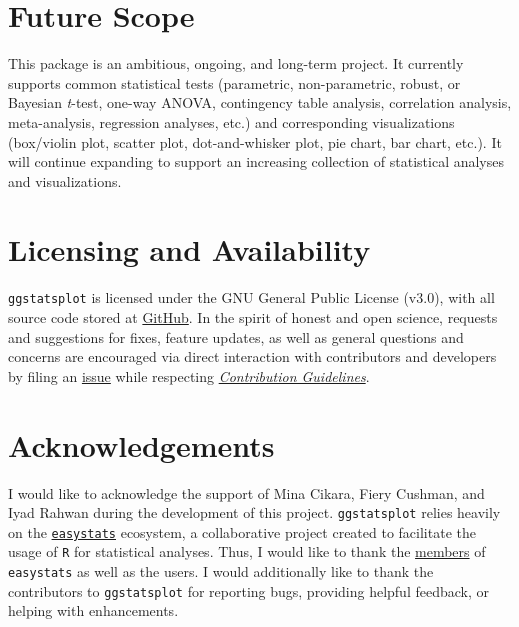 \documentclass[10pt,a4paper,onecolumn]{article}
\begin{document}
\hypertarget{future-scope}{%
\section{Future Scope}\label{future-scope}}

This package is an ambitious, ongoing, and long-term project. It
currently supports common statistical tests (parametric, non-parametric,
robust, or Bayesian \emph{t}-test, one-way ANOVA, contingency table
analysis, correlation analysis, meta-analysis, regression analyses,
etc.) and corresponding visualizations (box/violin plot, scatter plot,
dot-and-whisker plot, pie chart, bar chart, etc.). It will continue
expanding to support an increasing collection of statistical analyses
and visualizations.

\hypertarget{licensing-and-availability}{%
\section{Licensing and Availability}\label{licensing-and-availability}}

\texttt{ggstatsplot} is licensed under the GNU General Public License
(v3.0), with all source code stored at
\href{https://github.com/IndrajeetPatil/ggstatsplot/}{GitHub}. In the
spirit of honest and open science, requests and suggestions for fixes,
feature updates, as well as general questions and concerns are
encouraged via direct interaction with contributors and developers by
filing an
\href{https://github.com/IndrajeetPatil/ggstatsplot/issues}{issue} while
respecting
\href{https://indrajeetpatil.github.io/ggstatsplot/CONTRIBUTING.html}{\emph{Contribution
Guidelines}}.

\hypertarget{acknowledgements}{%
\section{Acknowledgements}\label{acknowledgements}}

I would like to acknowledge the support of Mina Cikara, Fiery Cushman,
and Iyad Rahwan during the development of this project.
\texttt{ggstatsplot} relies heavily on the
\href{https://github.com/easystats/easystats}{\texttt{easystats}}
ecosystem, a collaborative project created to facilitate the usage of
\texttt{R} for statistical analyses. Thus, I would like to thank the
\href{https://github.com/orgs/easystats/people}{members} of
\texttt{easystats} as well as the users. I would additionally like to
thank the contributors to \texttt{ggstatsplot} for reporting bugs,
providing helpful feedback, or helping with enhancements.
\end{document}
